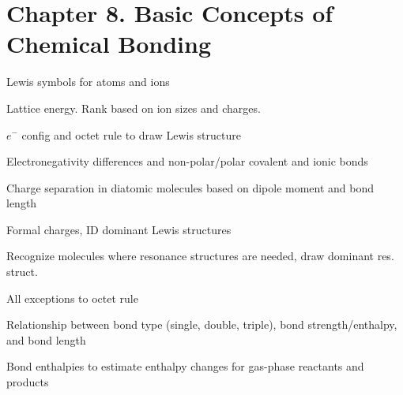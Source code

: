 \section{Chapter 8. Basic Concepts of Chemical Bonding}

\secttoc

{\footnotesize
\begin{multicols}{3}
\begin{compactenum}
    \item Lewis symbols for atoms and ions
    \item Lattice energy. Rank based on ion sizes and charges.
    \item $e^-$ config and octet rule to draw Lewis structure
    \item Electronegativity differences and non-polar/polar covalent and ionic
        bonds
    \item Charge separation in diatomic molecules based on dipole moment
        and bond length
    \item Formal charges, ID dominant Lewis structures
    \item Recognize molecules where resonance structures are needed, draw
        dominant res. struct.
    \item All exceptions to octet rule
    \item Relationship between bond type (single, double, triple),
        bond strength/enthalpy, and bond length
    \item Bond enthalpies to estimate enthalpy changes for gas-phase reactants
        and products
\end{compactenum}
\end{multicols}
}

